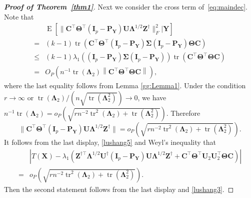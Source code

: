 \documentclass[12pt]{article} %
\DeclareMathOperator{\mytr}{tr}
\DeclareMathOperator{\myE}{E}
\newcommand{\bZ}{\mathbf{Z}}
\newcommand{\bX}{\mathbf{X}}
\newcommand{\bP}{\mathbf{P}}
\newcommand{\bY}{\mathbf{Y}}
\newcommand{\bC}{\mathbf{C}}
\newcommand{\bI}{\mathbf{I}}
\newcommand{\bU}{\mathbf{U}}
\newcommand{\bfsym}[1]{\ensuremath{\boldsymbol{#1}}}
\def\bLambda {\bfsym {\Lambda}}
\def\bSigma {\bfsym {\Sigma}}
\def\bTheta {\bfsym {\Theta}}
\theoremstyle{definition}
\begin{document}
\begin{appendices}
\begin{proof}[\textbf{Proof of Theorem~\ref{thm1}}]
Next we consider the cross term of~\eqref{eq:maindec}. Note that
$$
\begin{aligned}
    & \myE [\|\bC^\top \bTheta^\top (\bI_p -\bP_{\bY})\bU\bLambda^{1/2}\bZ^\dagger\|_F^2|\bY]
    \\
    = &
    (k-1)\mytr(\bC^\top \bTheta^\top (\bI_p -\bP_{\bY})\bSigma (\bI_p -\bP_{\bY})\bTheta \bC)\\
    \leq &
    (k-1)
    \lambda_1\left((\bI_p -\bP_{\bY})\bSigma (\bI_p -\bP_{\bY})\right)
    \mytr(\bC^\top \bTheta^\top  \bTheta \bC)\\
    =&
    O_P\left(
    n^{-1}\mytr(\bLambda_2)
    \left\|\bC^\top \bTheta^\top  \bTheta \bC\right\|
\right),
\end{aligned}
$$
where the last equality follows from Lemma \ref{gg:Lemma1}.
Under the condition $r\to \infty$ or $\mytr(\bLambda_2)/(n \sqrt{\mytr(\bLambda_2^2)})\to 0$, we have
$n^{-1}\mytr(\bLambda_2)=o_P\left(\sqrt{
        rn^{-2} \mytr^2 (\bLambda_2) + \mytr(\bLambda_2^2)
}\right)$.
Therefore
\begin{equation*}
\|\bC^\top \bTheta^\top (\bI_p -\bP_{\bY})\bU\bLambda^{1/2}\bZ^\dagger\|=
o_P\left(
\sqrt{
        rn^{-2} \mytr^2 (\bLambda_2) + \mytr(\bLambda_2^2)
}
\right)
.
\end{equation*}
It follows from the last display, \eqref{lushang5} and Weyl's inequality that
\begin{equation*}
    \begin{split}
    &\left|
    T(\bX)
    -
    \lambda_1\left(
        \bZ^{\dagger\top} \bLambda^{1/2} \bU^\dagger (\bI_p-\bP_\bY) \bU \bLambda^{1/2} \bZ^\dagger 
        +
        \bC^\top \bTheta^\top \bU_2 \bU_2^\top \bTheta \bC
    \right)
    \right|
    \\
    =&
o_P\left(
\sqrt{
        rn^{-2} \mytr^2 (\bLambda_2) + \mytr(\bLambda_2^2)
}
\right).
    \end{split}
\end{equation*}
Then the second statement follows from the last display and \eqref{lushang3}.


\end{proof}
\end{appendices}
\end{document}
